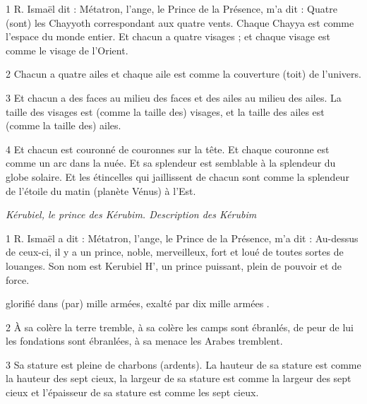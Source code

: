 \par 1 R. Ismaël dit : Métatron, l'ange, le Prince de la Présence, m'a dit : Quatre (sont) les Chayyoth correspondant aux quatre vents. Chaque Chayya est comme l’espace du monde entier. Et chacun a quatre visages ; et chaque visage est comme le visage de l'Orient.

\par 2 Chacun a quatre ailes et chaque aile est comme la couverture (toit) de l'univers.

\par 3 Et chacun a des faces au milieu des faces et des ailes au milieu des ailes. La taille des visages est (comme la taille des) visages, et la taille des ailes est (comme la taille des) ailes.

\par 4 Et chacun est couronné de couronnes sur la tête. Et chaque couronne est comme un arc dans la nuée. Et sa splendeur est semblable à la splendeur du globe solaire. Et les étincelles qui jaillissent de chacun sont comme la splendeur de l’étoile du matin (planète Vénus) à l’Est.


\par \textit{Kérubiel, le prince des Kérubim. Description des Kérubim}

\par 1 R. Ismaël a dit : Métatron, l'ange, le Prince de la Présence, m'a dit : Au-dessus de ceux-ci, il y a un prince, noble, merveilleux, fort et loué de toutes sortes de louanges. Son nom est Kerubiel H', un prince puissant, plein de pouvoir et de force.

\par [AD : un prince d'altesse, et l'altesse (est) avec lui, un prince juste, et la justice (est) avec lui, un prince saint, et la sainteté (est) avec lui, un prince] [B : un prince de grandeur, et avec lui (il y a) un prince juste, de justice, et avec lui un prince saint, de sainteté, et avec lui (il y a) un prince ] glorifié dans (par) mille armées, exalté par dix mille armées .

\par 2 À sa colère la terre tremble, à sa colère les camps sont ébranlés, de peur de lui les fondations sont ébranlées, à sa menace les Arabes tremblent.

\par 3 Sa stature est pleine de charbons (ardents). La hauteur de sa stature est comme la hauteur des sept cieux, la largeur de sa stature est comme la largeur des sept cieux et l'épaisseur de sa stature est comme les sept cieux.

